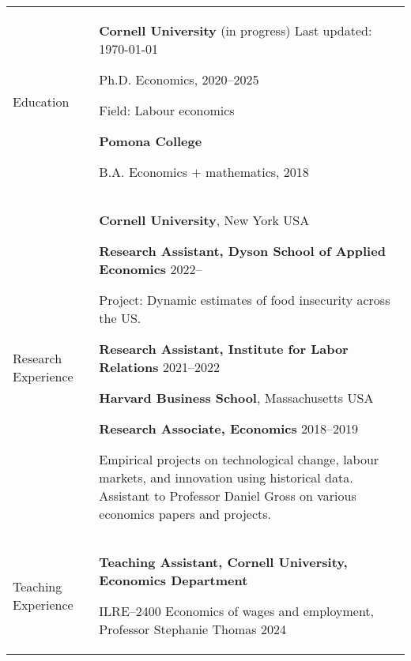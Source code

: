 \documentclass[letterpaper,11pt,oneside]{article}
\begin{document}
\noindent
\begin{tabular}[\textwidth]{p{} p{}}
    \Large{Education}
    & \textbf{Cornell University} (in progress)  \hfill Last updated: \today

    Ph.D. Economics, 2020--2025 
    
    Field: Labour economics
    
    \textbf{Pomona College}

    B.A. Economics $+$ mathematics, 2018 \vspace{0.2cm} \\
    
    
    
\Large{Research Experience}
    & \textbf{Cornell University}, New York USA
    
    \textbf{Research Assistant, Dyson School of Applied Economics} \hfill 2022--

    Project: Dynamic estimates of food insecurity across the US.
    
    \textbf{Research Assistant, Institute for Labor Relations} \hfill 2021--2022
    \vspace{0.1cm}

    \textbf{Harvard Business School}, Massachusetts USA
    
    \textbf{Research Associate, Economics} \hfill 2018--2019
    
    Empirical projects on technological change, labour markets, and innovation using historical data.
    Assistant to Professor Daniel Gross on various economics papers and projects.
    \vspace{0.2cm} \\

\Large{Teaching Experience}
    & \textbf{Teaching Assistant, Cornell University, Economics Department}
    
    ILRE--2400 Economics of wages and employment, Professor Stephanie Thomas \hfill 2024


\end{tabular}
\end{document}
